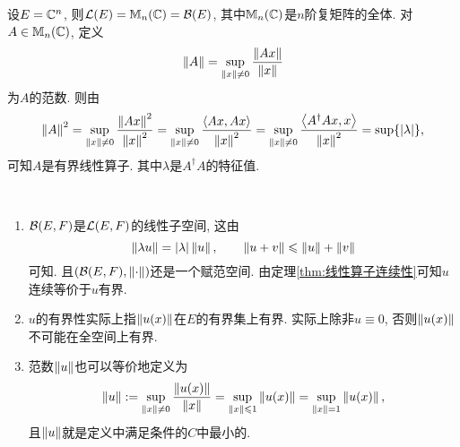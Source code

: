     \begin{Example}
        设$ E=\mathbb{C}^n $, 则$ \mathcal{L}(E)=\mathbb{M}_n(\mathbb{C})=\mathcal{B}(E) $, 其中$ \mathbb{M}_n(\mathbb{C}) $是$ n $阶复矩阵的全体. 对$ A\in\mathbb{M}_n(\mathbb{C}) $, 定义
        \[
            \left\| A \right\|=\sup_{\left\| x \right\|\ne 0}\frac{\left\| Ax \right\|}{\left\| x \right\|}
        \]
        为$ A $的范数. 则由
        \[
            \left\| A \right\|^2=\sup_{\left\| x \right\|\ne 0}\frac{\left\| Ax \right\|^2}{\left\| x \right\|^2}=\sup_{\left\| x \right\|\ne 0}\frac{\left\langle Ax,Ax \right\rangle}{\left\| x \right\|^2}=\sup_{\left\| x \right\|\ne 0}\frac{\left\langle A^\dagger Ax,x \right\rangle}{\left\| x \right\|^2}=\sup\{\left| \lambda \right| \},
        \]
        可知$ A $是有界线性算子. 其中$ \lambda $是$ A^\dagger A $的特征值.
    \end{Example}

    \begin{Remark}~
    \begin{enumerate}[(1)]\label{rmk:范数性质}
        \item $ \mathcal{B}(E,F) $是$ \mathcal{L}(E,F) $的线性子空间, 这由
        \[
            \left\| \lambda u \right\|=\left| \lambda \right| \left\| u \right\|,\qquad \left\| u+v \right\|\leqslant\left\| u \right\|+\left\| v \right\|
        \]
        可知. 且$ (\mathcal{B}(E,F),\left\| \cdot \right\|) $还是一个赋范空间. 由定理\ref{thm:线性算子连续性}可知$ u $连续等价于$ u $有界.

        \item $ u $的有界性实际上指$ \left\| u(x) \right\| $在$ E $的有界集上有界. 实际上除非$ u\equiv 0 $, 否则$ \left\| u(x) \right\| $不可能在全空间上有界.

        \item\label{rmk:范数性质最小C} 范数$ \left\| u \right\| $也可以等价地定义为
        \[
            \left\| u \right\|:=\sup_{\left\| x \right\|\ne 0}\frac{\left\| u(x) \right\|}{\left\| x \right\|}=\sup_{\left\| x \right\|\leqslant 1}\left\| u(x) \right\|=\sup_{\left\| x \right\|=1}\left\| u(x) \right\|,
        \]
        且$ \left\| u \right\| $就是定义中满足条件的$ C $中最小的.
    \end{enumerate}
    \end{Remark}

